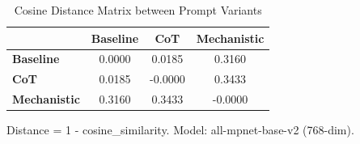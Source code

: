 \begin{table}[htbp]
\centering
\caption{Cosine Distance Matrix between Prompt Variants}
\label{tab:prompt_distance_matrix}
\begin{tabular}{lccc}
\toprule
 & \textbf{Baseline} & \textbf{CoT} & \textbf{Mechanistic} \\
\midrule
\textbf{Baseline} & 0.0000 & 0.0185 & 0.3160 \\
\textbf{CoT} & 0.0185 & -0.0000 & 0.3433 \\
\textbf{Mechanistic} & 0.3160 & 0.3433 & -0.0000 \\
\bottomrule
\end{tabular}
\begin{tablenotes}
\small
\item Distance = 1 - cosine\_similarity. Model: all-mpnet-base-v2 (768-dim).
\end{tablenotes}
\end{table}